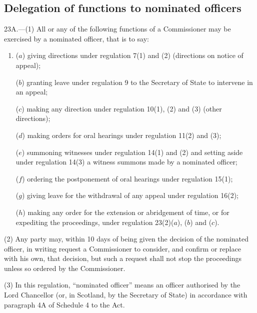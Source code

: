 \documentclass[12pt,a4paper]{article}
\begin{document}
\subsection[23A. Delegation of functions to nominated officers]{Delegation of functions to nominated officers}

23A.—(1) All or any of the following functions of a Commissioner may be exercised by a nominated officer, that is to say:
\begin{enumerate}\item[]
($a$) giving directions under regulation 7(1) and (2) (directions on notice of appeal);

($b$) granting leave under regulation 9 to the Secretary of State to intervene in an appeal;

($c$) making any direction under regulation 10(1), (2) and (3) (other directions);

($d$) making orders for oral hearings under regulation 11(2) and (3);

($e$) summoning witnesses under regulation 14(1) and (2) and setting aside under regulation 14(3) a witness summons made by a nominated officer;

($f$) ordering the postponement of oral hearings under regulation 15(1);

($g$) giving leave for the withdrawal of any appeal under regulation 16(2);

($h$) making any order for the extension or abridgement of time, or for expediting the proceedings, under regulation 23(2)($a$), ($b$) and ($c$).
\end{enumerate}

(2) Any party may, within 10 days of being given the decision of the nominated officer, in writing request a Commissioner to consider, and confirm or replace with his own, that decision, but such a request shall not stop the proceedings unless so ordered by the Commissioner.

(3) In this regulation, “nominated officer” means an officer authorised by the Lord Chancellor (or, in Scotland, by the Secretary of State) in accordance with paragraph 4A of Schedule 4 to the Act.

\end{document}
